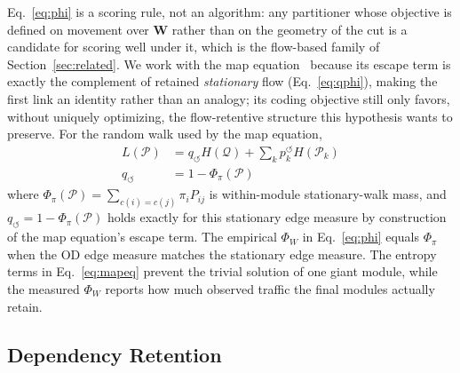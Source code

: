 \documentclass[journal]{IEEEtran}
\theoremstyle{definition}
\begin{document}
Eq.~\eqref{eq:phi} is a scoring rule, not an algorithm: any partitioner whose objective is defined on movement over $\mathbf{W}$ rather than on the geometry of the cut is a candidate for scoring well under it, which is the flow-based family of Section~\ref{sec:related}. We work with the map equation~\citep{rosvall2008maps,rosvall2009mapequation} because its escape term is exactly the complement of retained \emph{stationary} flow (Eq.~\eqref{eq:qphi}), making the first link an identity rather than an analogy; its coding objective still only favors, without uniquely optimizing, the flow-retentive structure this hypothesis wants to preserve.
For the random walk used by the map equation,
\begin{align}
    L(\mathcal{P})
     & =
    q_{\circlearrowleft}H(\mathcal{Q})
    +\sum_k p_k^{\circlearrowleft}H(\mathcal{P}_k)
    \label{eq:mapeq} \\
    q_{\circlearrowleft}
     & =
    1-\Phi_\pi(\mathcal{P})
    \label{eq:qphi}
\end{align}
where $\Phi_\pi(\mathcal{P})=\sum_{c(i)=c(j)}\pi_iP_{ij}$ is within-module stationary-walk mass, and $q_{\circlearrowleft}=1-\Phi_\pi(\mathcal{P})$ holds exactly for this stationary edge measure by construction of the map equation's escape term. The empirical $\Phi_W$ in Eq.~\eqref{eq:phi} equals $\Phi_\pi$ when the OD edge measure matches the stationary edge measure. The entropy terms in Eq.~\eqref{eq:mapeq} prevent the trivial solution of one giant module, while the measured $\Phi_W$ reports how much observed traffic the final modules actually retain.

\subsection{Dependency Retention}
\label{sec:psi}
\end{document}
